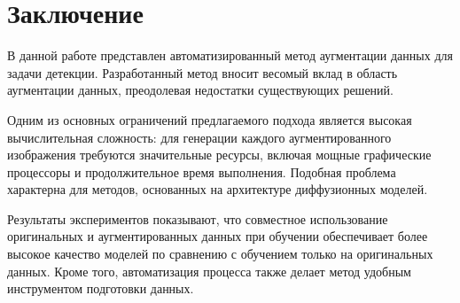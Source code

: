 \section{Заключение}

В данной работе представлен автоматизированный метод аугментации данных для задачи детекции. Разработанный метод вносит весомый вклад в область аугментации данных, преодолевая недостатки существующих решений.

Одним из основных ограничений предлагаемого подхода является высокая вычислительная сложность: для генерации каждого аугментированного изображения требуются значительные ресурсы, включая мощные графические процессоры и продолжительное время выполнения. Подобная проблема характерна для методов,  основанных на архитектуре диффузионных моделей.

Результаты экспериментов показывают, что совместное использование оригинальных и аугментированных данных при обучении обеспечивает более высокое качество моделей по сравнению с обучением только на оригинальных данных. Кроме того, автоматизация процесса также делает метод удобным инструментом подготовки данных.